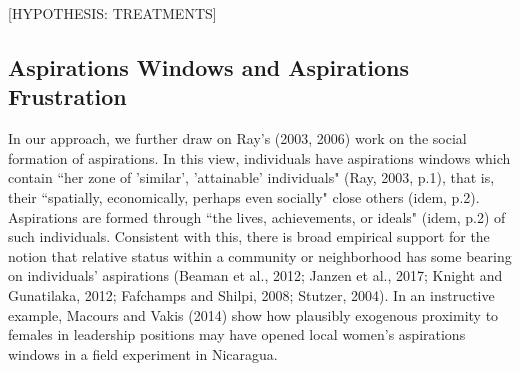\documentclass[11.5pt]{article}
\begin{document}
[HYPOTHESIS: TREATMENTS]



\subsection{Aspirations Windows and Aspirations Frustration}

In our approach, we further draw on Ray's (2003, 2006) work on the social formation of aspirations. In this view, individuals have aspirations windows which contain ``her zone of 'similar', 'attainable' individuals" (Ray, 2003, p.1), that is, their ``spatially, economically, perhaps even socially" close others (idem, p.2). Aspirations are formed through ``the lives, achievements, or ideals" (idem, p.2) of such individuals. Consistent with this, there is broad empirical support for the notion that relative status within a community or neighborhood has some bearing on individuals' aspirations (Beaman et al., 2012; Janzen et al., 2017; Knight and Gunatilaka, 2012; Fafchamps and Shilpi, 2008; Stutzer, 2004). In an instructive example, Macours and Vakis (2014) show how plausibly exogenous proximity to females in leadership positions may have opened local women's aspirations windows in a field experiment in Nicaragua.
\end{document}

